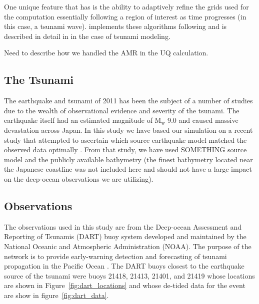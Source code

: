 One unique feature that \geoclaw has is the ability to adaptively refine the grids used for the computation essentially following a region of interest as time progresses (in this case, a tsunami wave).  \geoclaw implements these algorithms following \cite{Berger:1984ui,Berger:1998aa} and is described in detail in \cite{Berger:2011du} in the case of tsunami modeling.

\alert{Need to describe how we handled the AMR in the UQ calculation.}

\subsection{The \tohoku Tsunami} \label{ssub:tohoku}

The \tohoku earthquake and tsunami of 2011 has been the subject of a number of studies due to the wealth of observational evidence and severity of the tsunami.  The earthquake itself had an estimated magnitude of $\text{M}_\text{w}$ 9.0 and caused massive devastation across Japan.  In this study we have based our simulation on a recent study that attempted to ascertain which source earthquake model matched the observed data optimally \cite{MacInnes:2013cr}.  From that study, we have used \alert{SOMETHING} source model and the publicly available bathymetry (the finest bathymetry located near the Japanese coastline was not included here and should not have a large impact on the deep-ocean observations we are utilizing).

\subsection{Observations}

The observations used in this study are from the Deep-ocean Assessment and Reporting of Tsunamis (DART) buoy system developed and maintained by the National Oceanic and Atmospheric Administration (NOAA).  The purpose of the network is to provide early-warning detection and forecasting of tsunami propagation in the Pacific Ocean \cite{Percival:2011}.  The DART buoys closest to the earthquake source of the \tohoku tsunami were buoys 21418, 21413, 21401, and 21419 whose locations are shown in Figure~\ref{fig:dart_locations} and whose de-tided data for the event are show in figure~\ref{fig:dart_data}.


